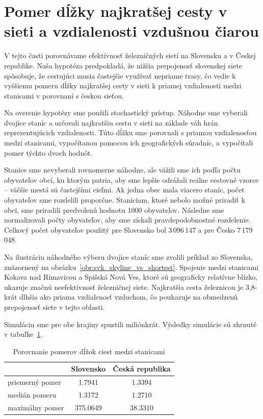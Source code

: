 \documentclass[main.tex]{subfiles}
\begin{document}
	
\section{Pomer dĺžky najkratšej cesty v sieti a vzdialenosti vzdušnou čiarou}
\label{sec:random_paths}

V tejto časti porovnávame efektívnosť železničných sietí na Slovensku a v Českej republike. Naša hypotéza predpokladá, že nižšia prepojenosť slovenskej siete spôsobuje, že cestujúci musia častejšie využívať nepriame trasy, čo vedie k vyššiemu pomeru dĺžky najkratšej cesty v sieti k priamej vzdialenosti medzi stanicami v porovnaní s českou sieťou.

Na overenie hypotézy sme použili stochastický prístup. Náhodne sme vyberali dvojice staníc a určovali najkratšiu cestu v sieti na základe váh hrán reprezentujúcich vzdialenosti. Túto dĺžku sme porovnali s priamou vzdialenosťou medzi stanicami, vypočítanou pomocou ich geografických súradníc, a vypočítali pomer týchto dvoch hodnôt.

Stanice sme nevyberali rovnomerne náhodne, ale vážili sme ich podľa počtu obyvateľov obcí, ku ktorým patria, aby sme lepšie odrážali reálne cestovné vzorce – väčšie mestá sú častejšími cieľmi. Ak jedna obec mala viacero staníc, počet obyvateľov sme rozdelili proporčne. Staniciam, ktoré nebolo možné priradiť k obci, sme priradili predvolenú hodnotu 1000 obyvateľov. Následne sme normalizovali počty obyvateľov, aby sme získali pravdepodobnostné rozdelenie. Celkový počet obyvateľov použitý pre Slovensko bol 3\,096\,147 a pre Česko 7\,179\,048.

Na ilustráciu náhodného výberu dvojice staníc sme zvolili príklad zo Slovenska, znázornený na obrázku~\ref{obr:svk_skyline_vs_shortest}. Spojenie medzi stanicami Kokava nad Rimavicou a Spišská Nová Ves, ktoré sú geograficky relatívne blízko, ukazuje značnú neefektívnosť železničnej siete. Najkratšia cesta železnicou je 3,8-krát dlhšia ako priama vzdialenosť vzduchom, čo poukazuje na obmedzenú prepojenosť siete v tejto oblasti.

Simuláciu sme pre obe krajiny spustili miliónkrát. Výsledky simulácie sú zhrnuté v tabuľke~\ref{tab:ratios}.

\begin{table}[H]
\centering
\begin{tabular}{|l|c|c|}
\hline
 & Slovensko & Česká republika \\
\hline
priemerný pomer & 1.7941 & 1.3394 \\
medián pomeru & 1.3172 & 1.2710 \\
maximálny pomer & 375.0649 & 38.3310 \\
\hline
\end{tabular}
\caption{Porovnanie pomerov dĺžok ciest medzi stanicami}
\label{tab:ratios}
\end{table}
\end{document}
